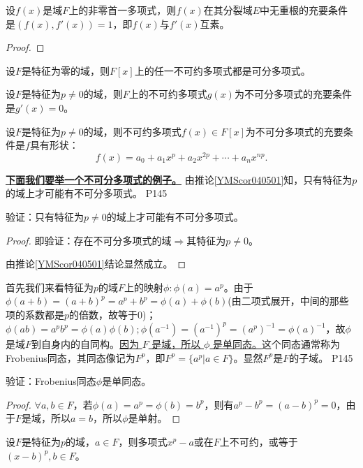 \begin{theorem}
	设$f(x)$是域$F$上的非零首一多项式，则$f(x)$在其分裂域$E$中无重根的充要条件是$(f(x),f'(x))=1$，即$f(x)$与$f'(x)$互素。
\end{theorem}

\begin{proof}
	
\end{proof}


\begin{corollary}\label{YMScor040501}
	设$F$是特征为零的域，则$F[x]$上的任一不可约多项式都是可分多项式。	
\end{corollary}


\begin{corollary}
	设$F$是特征为$p\neq 0$的域，则$F$上的不可约多项式$g(x)$为不可分多项式的充要条件是$g'(x)=0$。	
\end{corollary}


\begin{corollary}
	设$F$是特征为$p\neq 0$的域，则不可约多项式$f(x)\in F[x] $为不可分多项式的充要条件是$f$具有形状：
	\begin{equation*}
		f(x)=a_{0}+a_{1}x^{p}+a_{2}x^{2p}+\cdots +a_{n}x^{np}.
	\end{equation*}
\end{corollary}
	
\original
{
	\textbf{\uline{下面我们要举一个不可分多项式的例子。} }由推论\ref{YMScor040501}知，只有特征为$p$的域上才可能有不可分多项式。
}
{P145}

\begin{proposition}
	验证：只有特征为$p\neq 0$的域上才可能有不可分多项式。
\end{proposition}

\begin{proof}
	即验证：存在不可分多项式的域$\Rightarrow$其特征为$p\neq 0 $。
	\par
	由推论\ref{YMScor040501}结论显然成立。
\end{proof}

\original
{
	首先我们来看特征为$p$的域$F$上的映射$\phi:\phi(a)=a^{p}$。由于$\phi(a+b)=(a+b)^{p}=a^{p}+b^{p}=\phi(a)+\phi(b)$(由二项式展开，中间的那些项的系数都是$p$的倍数，故等于0)；$\phi(ab)=a^{p}b^{p}=\phi(a)\phi(b);\phi(a^{-1})=(a^{-1})^{p}=(a^{p})^{-1}=\phi(a)^{-1}$，故$\phi$是域$F$到自身内的自同构。\uline{因为 $F$ 是域，所以 $\phi$ 是单同态。}这个同态通常称为Frobenius同态，其同态像记为$F^{p}$，即$F^{p}=\{a^{p}\big| a\in F\}$。显然$F^{p}$是$F$的子域。
}
{P145}

\begin{proposition}
	验证：Frobenius同态$\phi$是单同态。
\end{proposition}
\begin{proof}
	$\forall a,b\in F$，若$\phi(a)=a^{p}=\phi(b)=b^{p}$，则有$a^{p}-b^{p}=(a-b)^{p}=0$，由于$F$是域，所以$a=b$，所以$\phi$是单射。
\end{proof}

\begin{lemma}
	设$F$是特征为$p$的域，$a\in F$，则多项式$x^{p}-a$或在$F$上不可约，或等于$(x-b)^{p},b\in F$。
\end{lemma}













